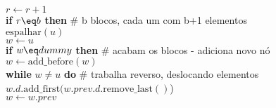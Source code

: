 \documentclass{beamer}
\begin{document}
\begin{frame}[shrink]
\begin{oframed}
\begin{flushleft}
\hspace*{1em} \hspace*{1em} \hspace*{1em} \ensuremath{\ensuremath{\mathit{r}} \gets  \ensuremath{\ensuremath{\mathit{r}} + 1}}\\
\hspace*{1em} \hspace*{1em} {\color{black} \textbf{if}} \ensuremath{\ensuremath{\mathit{r}} \eq b} {\color{black} \textbf{then}}   {\color{green}\# b blocos, cada um com b+1 elementos}\\
\hspace*{1em} \hspace*{1em} \hspace*{1em} \ensuremath{\mathrm{espalhar}(\ensuremath{\mathit{u}})}\\
\hspace*{1em} \hspace*{1em} \hspace*{1em} \ensuremath{\ensuremath{\mathit{w}} \gets  \ensuremath{u}}\\
\hspace*{1em} \hspace*{1em} {\color{black} \textbf{if}} \ensuremath{\ensuremath{\mathit{w}} \eq dummy} {\color{black} \textbf{then}}  {\color{green}\# acabam os blocos - adiciona novo nó}\\
\hspace*{1em} \hspace*{1em} \hspace*{1em} \ensuremath{\ensuremath{\mathit{w}} \gets  \ensuremath{\mathrm{add\_before}(\ensuremath{\mathit{w}})}}\\
\hspace*{1em} \hspace*{1em} {\color{black} \textbf{while}} \ensuremath{\ensuremath{\mathit{w}} \ne u} {\color{black} \textbf{do}}  {\color{green}\# trabalha reverso, deslocando elementos}\\
\hspace*{1em} \hspace*{1em} \hspace*{1em}  \ensuremath{\ensuremath{\mathit{w}}.\ensuremath{\mathit{d}}.\mathrm{add\_first}(\ensuremath{\mathit{w}}.\ensuremath{\mathit{prev}}.\ensuremath{\mathit{d}}.\mathrm{remove\_last}()})\\
\hspace*{1em} \hspace*{1em} \hspace*{1em}  \ensuremath{\ensuremath{\mathit{w}} \gets  \ensuremath{\ensuremath{\mathit{w}}.prev}}\\

\end{flushleft}
\end{oframed}
\end{frame}
\end{document}
